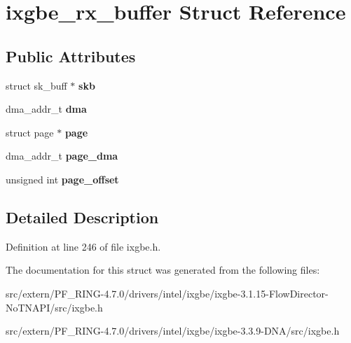 \hypertarget{structixgbe__rx__buffer}{
\section{ixgbe\_\-rx\_\-buffer Struct Reference}
\label{structixgbe__rx__buffer}
}
\subsection*{Public Attributes}
\begin{DoxyCompactItemize}
\item 
\hypertarget{structixgbe__rx__buffer_a6e5146c1426db70a6f8db1737b9f74d7}{
struct sk\_\-buff $\ast$ {\bfseries skb}}
\label{structixgbe__rx__buffer_a6e5146c1426db70a6f8db1737b9f74d7}

\item 
\hypertarget{structixgbe__rx__buffer_a70b9b15964bfca5a9ea23326bd41608e}{
dma\_\-addr\_\-t {\bfseries dma}}
\label{structixgbe__rx__buffer_a70b9b15964bfca5a9ea23326bd41608e}

\item 
\hypertarget{structixgbe__rx__buffer_a9d736e83c30537e3bbd0c14c313d3879}{
struct page $\ast$ {\bfseries page}}
\label{structixgbe__rx__buffer_a9d736e83c30537e3bbd0c14c313d3879}

\item 
\hypertarget{structixgbe__rx__buffer_af925adb19e2c438aa9fb4a22b250422a}{
dma\_\-addr\_\-t {\bfseries page\_\-dma}}
\label{structixgbe__rx__buffer_af925adb19e2c438aa9fb4a22b250422a}

\item 
\hypertarget{structixgbe__rx__buffer_a3cfa24011e5f795cf0021fad66fd9291}{
unsigned int {\bfseries page\_\-offset}}
\label{structixgbe__rx__buffer_a3cfa24011e5f795cf0021fad66fd9291}

\end{DoxyCompactItemize}


\subsection{Detailed Description}


Definition at line 246 of file ixgbe.h.



The documentation for this struct was generated from the following files:\begin{DoxyCompactItemize}
\item 
src/extern/PF\_\-RING-\/4.7.0/drivers/intel/ixgbe/ixgbe-\/3.1.15-\/FlowDirector-\/NoTNAPI/src/ixgbe.h\item 
src/extern/PF\_\-RING-\/4.7.0/drivers/intel/ixgbe/ixgbe-\/3.3.9-\/DNA/src/ixgbe.h\end{DoxyCompactItemize}
